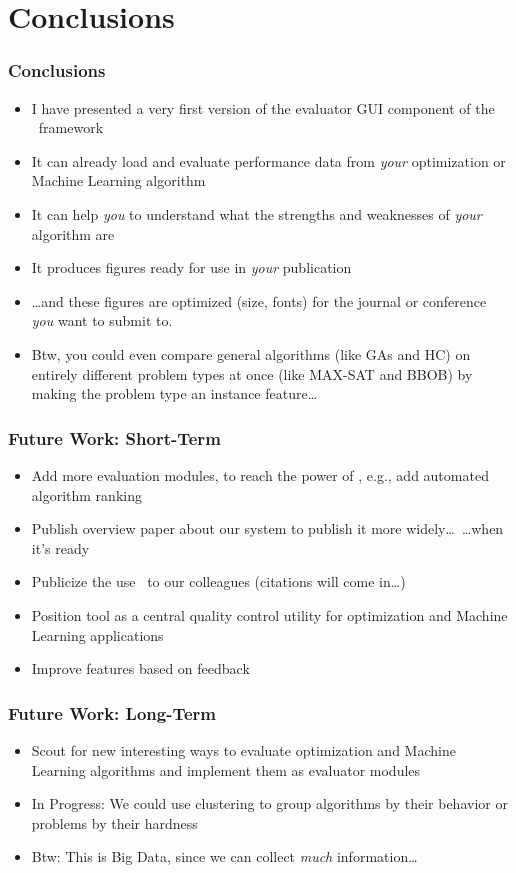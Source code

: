 %
\section{Conclusions}%
%
\begin{frame}%
\frametitle{Conclusions}%
\begin{itemize}%
\item I have presented a very first version of the evaluator GUI component of the \optimizationBenchmarking\ framework%
\item<2-> It can already load and evaluate performance data from \emph{your} optimization or Machine Learning algorithm%
\item<3-> It can help \emph{you} to understand what the strengths and weaknesses of \emph{your} algorithm are%
\item<4-> It produces figures ready for use in \emph{your} publication%
\item<5-> {\dots}and these figures are optimized (size, fonts) for the journal or conference \emph{you} want to submit to.%
\item<6-> Btw, you could even compare general algorithms (like GAs and HC) on entirely different problem types at once (like MAX-SAT and BBOB) by making the problem type an instance feature\dots%
\end{itemize}%
\end{frame}
%
%
\begin{frame}%
\frametitle{Future Work: Short-Term}%
\begin{itemize}%
\item Add more evaluation modules, to reach the power of \tspSuite\expandafter\sciptep{\tspSuiteReferences}, e.g., add automated algorithm ranking%
\item<2-> Publish overview paper about our system to publish it more widely\dots\ {\dots}when it's ready%
\item<3-> Publicize the use \optimizationBenchmarking\ to our colleagues (citations will come in\dots)%
\item<4-> Position tool as a central quality control utility for optimization and Machine Learning applications%
\item<5-> Improve features based on feedback%
\end{itemize}%
\end{frame}
%
\begin{frame}%
\frametitle{Future Work: Long-Term}%
\begin{itemize}%
\item Scout for new interesting ways to evaluate optimization and Machine Learning algorithms and implement them as evaluator modules%
\item<2-> In Progress: We could use clustering to group algorithms by their behavior or problems by their hardness%
\item<3-> Btw: This is Big Data, since we can collect \emph{much} information\dots%
\end{itemize}%
\end{frame}%
%